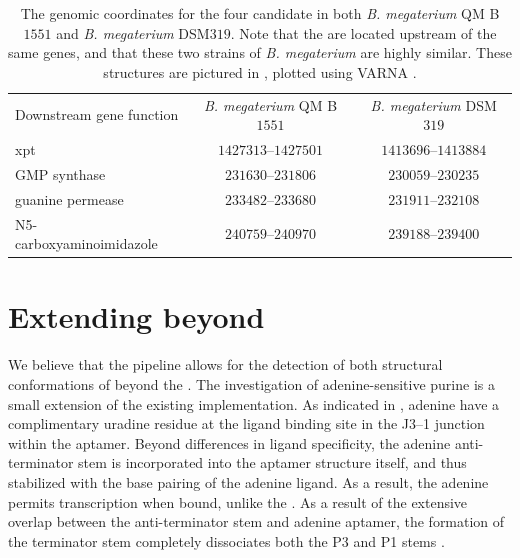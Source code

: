 \begin{table}[!ht]
\centering
\begin{tabularx}{\linewidth}{*{1}{L} *{2}{C}}
\toprule
\small{Downstream gene function} & \small{{\em B. megaterium} QM B$1551$} & \small{{\em B. megaterium} DSM$319$} \\
\cmidrule(lr){1-3}
\small{xpt} & $1427313$--$1427501$ & $1413696$--$1413884$ \\[1ex]
\small{GMP synthase} & $231630$--$231806$ & $230059$--$230235$ \\[1ex]
\small{guanine permease} & $233482$--$233680$ & $231911$--$232108$ \\[1ex]
\small{N5-carboxyaminoimidazole} & $240759$--$240970$ & $239188$--$239400$ \\
\bottomrule
\end{tabularx}
\caption[The genomic coordinates for the four candidate \grbs in both
{\em B. megaterium} QM B$1551$ and {\em B. megaterium} DSM$319$]{The genomic coordinates for the four candidate \grbs in both
{\em B. megaterium} QM B$1551$ and {\em B. megaterium} DSM$319$. Note that the
\grbs are located upstream of the same genes, and that these two strains of
{\em B. megaterium} are highly similar. These structures are pictured in
, plotted using VARNA \citep{darty:2009gt}.}
\label{table:rfinderCandidateLocs}
\end{table}

\section{Extending beyond \grbs}
\label{sec:rfinder:ext}

We believe that the \rfinder pipeline allows for the detection of both structural
conformations of \rbs beyond the \grb. The investigation of
adenine-sensitive purine \rbs is a small extension of the existing
implementation. As indicated in , adenine
\rbs have a complimentary uradine residue at the ligand binding site in
the J3--1 junction within the aptamer. Beyond differences in ligand specificity,
the adenine \rb anti-terminator stem is incorporated into the aptamer structure
itself, and thus stabilized with the base pairing of the adenine ligand. As a
result, the adenine \rb permits transcription when bound, unlike the \grb.
As a result of the extensive overlap between the anti-terminator stem and adenine
\rb aptamer, the formation of the terminator stem completely dissociates both the
P3 and P1 stems \citep{mandal2004a}.

